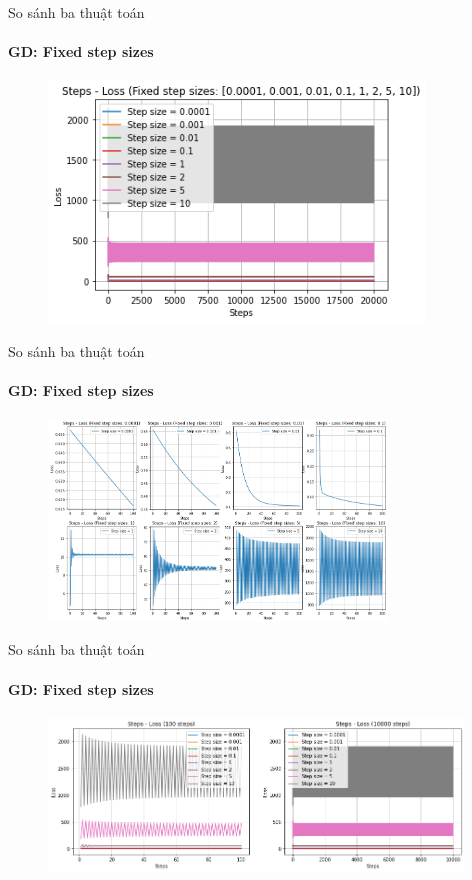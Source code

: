 \documentclass[10pt]{beamer}
\theoremstyle{remark}
\theoremstyle{definition}
\begin{document}
\begin{frame}{So sánh ba thuật toán}
	\framesubtitle{GD: Fixed step sizes}
	\begin{figure}[h!]
		\centering
		\includegraphics[width=10cm]{Thinh/1.png}
	  \end{figure}

\end{frame}
\begin{frame}{So sánh ba thuật toán}
	\framesubtitle{GD: Fixed step sizes}

	  \begin{figure}[h!]
		\centering
		\includegraphics[width=9cm]{Thinh/2.png}
	  \end{figure}

\end{frame}
\begin{frame}{So sánh ba thuật toán}
	\framesubtitle{GD: Fixed step sizes}

	  \begin{figure}[h!]
		\centering
		\includegraphics[width=11cm]{Thinh/3.png}
	  \end{figure}


\end{frame}
\end{document}
